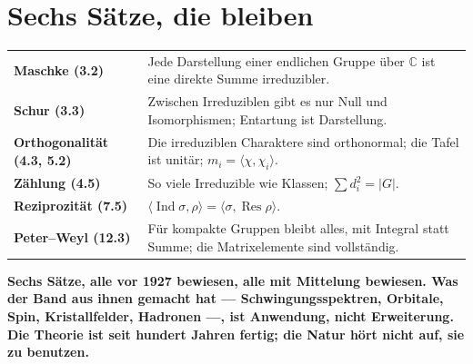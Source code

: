 \begin{merksatz}
\begin{center}
\begin{minipage}{0.88\textwidth}
\end{minipage}
\end{center}
\end{merksatz}

\section{Sechs Sätze, die bleiben}

\begin{merksatz}
\begin{center}
{\small
\renewcommand{\arraystretch}{1.6}
\begin{tabular}{@{}P{3.2cm}P{5.4cm}@{}}
\toprule
\textbf{Maschke (3.2)} & Jede Darstellung einer endlichen Gruppe über $\mathbb C$ ist eine direkte Summe irreduzibler.\\
\textbf{Schur (3.3)} & Zwischen Irreduziblen gibt es nur Null und Isomorphismen; Entartung ist Darstellung.\\
\textbf{Orthogonalität (4.3, 5.2)} & Die irreduziblen Charaktere sind orthonormal; die Tafel ist unitär; $m_i = \langle\chi, \chi_i\rangle$.\\
\textbf{Zählung (4.5)} & So viele Irreduzible wie Klassen; $\sum d_i^{2} = |G|$.\\
\textbf{Reziprozität (7.5)} & $\langle\operatorname{Ind}\sigma, \rho\rangle = \langle\sigma, \operatorname{Res}\rho\rangle$.\\
\textbf{Peter--Weyl (12.3)} & Für kompakte Gruppen bleibt alles, mit Integral statt Summe; die Matrixelemente sind vollständig.\\
\bottomrule
\end{tabular}}
\end{center}

\begin{center}
\begin{minipage}{0.9\textwidth}
\textbf{Sechs Sätze, alle vor 1927 bewiesen, alle mit Mittelung bewiesen. Was der Band aus ihnen gemacht hat --- Schwingungsspektren, Orbitale, Spin, Kristallfelder, Hadronen ---, ist Anwendung, nicht Erweiterung. Die Theorie ist seit hundert Jahren fertig; die Natur hört nicht auf, sie zu benutzen.}
\end{minipage}
\end{center}
\end{merksatz}

